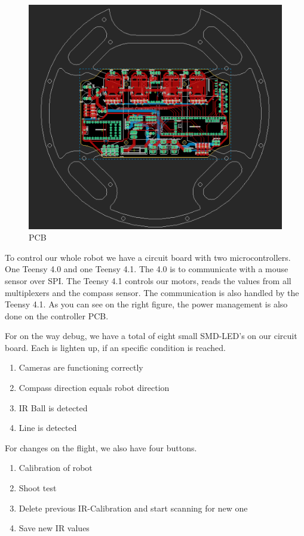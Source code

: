 \begin{figure}
    \centering
    \includegraphics[width=0.75\linewidth]{img/eagle/ControllerPCB.png}
    \caption{PCB}
    \label{fig:CPCB}
\end{figure}

To control our whole robot we have a circuit board with two microcontrollers. One Teensy 4.0 and one Teensy 4.1. The 4.0 is to communicate with
a mouse sensor over SPI. The Teensy 4.1 controls our motors, reads the values from all multiplexers and the compass sensor. The communication is also 
handled by the Teensy 4.1. 
\newline
As you can see on the right figure, the power management is also done on the controller PCB.
\newline

For on the way debug, we have a total of eight small SMD-LED's on our circuit board.
Each is lighten up, if an specific condition is reached.
\begin{enumerate}
    \item{Cameras are functioning correctly}
    \item{Compass direction equals robot direction}
    \item{IR Ball is detected}
    \item{Line is detected}
\end{enumerate}

\hfill \break
For changes on the flight, we also have four buttons. 
\begin{enumerate}
    \item{Calibration of robot}
    \item{Shoot test}
    \item{Delete previous IR-Calibration and start scanning for new one}
    \item{Save new IR values}
\end{enumerate}
\hfill \break

